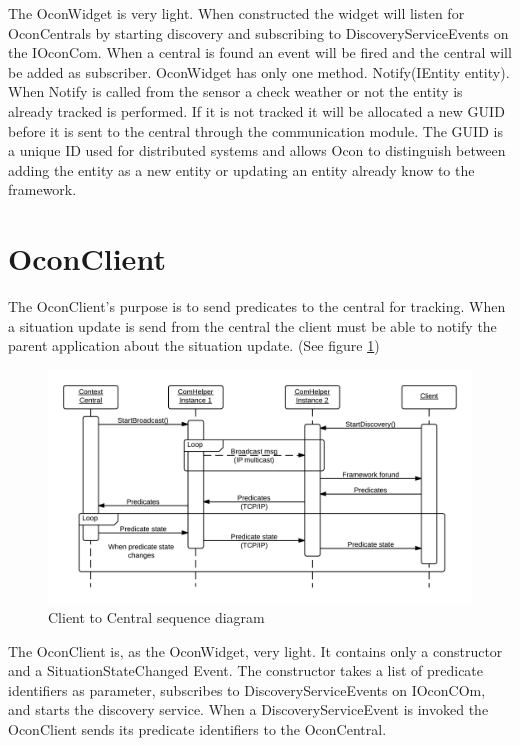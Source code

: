 \documentclass[../report.tex]{subfiles}
\begin{document}
The OconWidget is very light. When constructed the widget will listen for OconCentrals by starting discovery and subscribing to DiscoveryServiceEvents on the IOconCom. When a central is found an event will be fired and the central will be added as subscriber. OconWidget has only one method. Notify(IEntity entity). When Notify is called from the sensor a check weather or not the entity is already tracked is performed. If it is not tracked it will be allocated a new GUID before it is sent to the central through the communication module. The GUID is a unique ID used for distributed systems and allows Ocon to distinguish between adding the entity as a new entity or updating an entity already know to the framework.

\section{OconClient}
The OconClient's purpose is to send predicates to the central for tracking. When a situation update is send from the central the client must be able to notify the parent application about the situation update. (See figure \ref{fig:clientComHelper})

\begin{figure}
\hspace{-70px}
\includegraphics[width=500px]{comHelperSequence-client.png}
\caption{Client to Central sequence diagram}
\label{fig:clientComHelper}
\end{figure}

The OconClient is, as the OconWidget, very light. It contains only a constructor and a SituationStateChanged Event. The constructor takes a list of predicate identifiers as parameter, subscribes to DiscoveryServiceEvents on IOconCOm, and starts the discovery service. When a DiscoveryServiceEvent is invoked the OconClient sends its predicate identifiers to the OconCentral.
\end{document}
